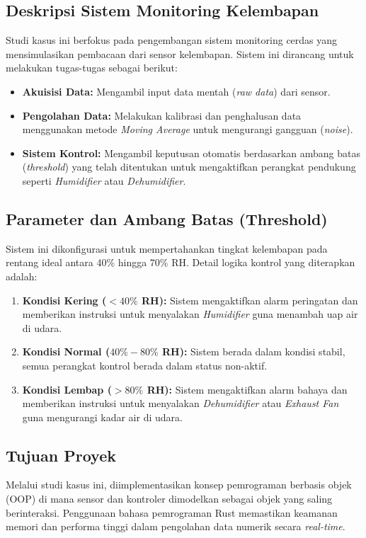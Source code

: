 \documentclass[12pt,a4paper]{article}
\begin{document}
\subsection{Deskripsi Sistem Monitoring Kelembapan}
Studi kasus ini berfokus pada pengembangan sistem monitoring cerdas yang mensimulasikan pembacaan dari sensor kelembapan. Sistem ini dirancang untuk melakukan tugas-tugas sebagai berikut:
\begin{itemize}
    \item \textbf{Akuisisi Data:} Mengambil input data mentah (\textit{raw data}) dari sensor.
    \item \textbf{Pengolahan Data:} Melakukan kalibrasi dan penghalusan data menggunakan metode \textit{Moving Average} untuk mengurangi gangguan (\textit{noise}).
    \item \textbf{Sistem Kontrol:} Mengambil keputusan otomatis berdasarkan ambang batas (\textit{threshold}) yang telah ditentukan untuk mengaktifkan perangkat pendukung seperti \textit{Humidifier} atau \textit{Dehumidifier}.
\end{itemize}

\subsection{Parameter dan Ambang Batas (Threshold)}
Sistem ini dikonfigurasi untuk mempertahankan tingkat kelembapan pada rentang ideal antara 40\% hingga 70\% RH. Detail logika kontrol yang diterapkan adalah:
\begin{enumerate}
    \item \textbf{Kondisi Kering ($< 40\%$ RH):} Sistem mengaktifkan alarm peringatan dan memberikan instruksi untuk menyalakan \textit{Humidifier} guna menambah uap air di udara.
    \item \textbf{Kondisi Normal ($40\% - 80\%$ RH):} Sistem berada dalam kondisi stabil, semua perangkat kontrol berada dalam status non-aktif.
    \item \textbf{Kondisi Lembap ($> 80\%$ RH):} Sistem mengaktifkan alarm bahaya dan memberikan instruksi untuk menyalakan \textit{Dehumidifier} atau \textit{Exhaust Fan} guna mengurangi kadar air di udara.
\end{enumerate}



\subsection{Tujuan Proyek}
Melalui studi kasus ini, diimplementasikan konsep pemrograman berbasis objek (OOP) di mana sensor dan kontroler dimodelkan sebagai objek yang saling berinteraksi. Penggunaan bahasa pemrograman Rust memastikan keamanan memori dan performa tinggi dalam pengolahan data numerik secara \textit{real-time}.
\end{document}
